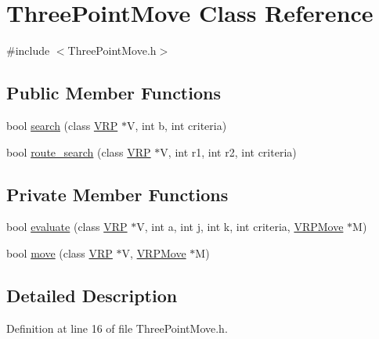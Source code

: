 \hypertarget{class_three_point_move}{
\section{ThreePointMove Class Reference}
\label{class_three_point_move}
}


{\ttfamily \#include $<$ThreePointMove.h$>$}

\subsection*{Public Member Functions}
\begin{DoxyCompactItemize}
\item 
bool \hyperlink{class_three_point_move_a8d4a8933908802a1011a241c6a95656f}{search} (class \hyperlink{class_v_r_p}{VRP} $\ast$V, int b, int criteria)
\item 
bool \hyperlink{class_three_point_move_af7b3c78be14368797995f90ab19f8975}{route\_\-search} (class \hyperlink{class_v_r_p}{VRP} $\ast$V, int r1, int r2, int criteria)
\end{DoxyCompactItemize}
\subsection*{Private Member Functions}
\begin{DoxyCompactItemize}
\item 
bool \hyperlink{class_three_point_move_ab60463d57ff0cb5cb1fc113063221b86}{evaluate} (class \hyperlink{class_v_r_p}{VRP} $\ast$V, int a, int j, int k, int criteria, \hyperlink{class_v_r_p_move}{VRPMove} $\ast$M)
\item 
bool \hyperlink{class_three_point_move_a0dd8bbb3ff4ff38fc1459e021f52d072}{move} (class \hyperlink{class_v_r_p}{VRP} $\ast$V, \hyperlink{class_v_r_p_move}{VRPMove} $\ast$M)
\end{DoxyCompactItemize}


\subsection{Detailed Description}


Definition at line 16 of file ThreePointMove.h.



